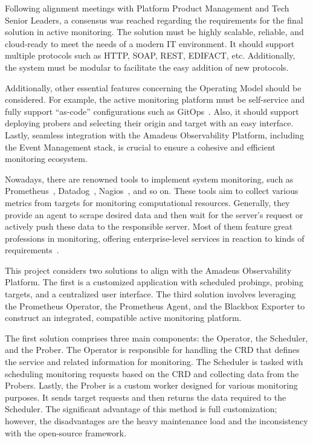 Following alignment meetings with Platform Product Management and Tech Senior Leaders, a consensus was reached regarding the requirements for the final solution in active monitoring. The solution must be highly scalable, reliable, and cloud-ready to meet the needs of a modern \ac{IT} environment. It should support multiple protocols such as \ac{HTTP}, \ac{SOAP}, \ac{REST}, \ac{EDIFACT}, etc. Additionally, the system must be modular to facilitate the easy addition of new protocols.

Additionally, other essential features concerning the Operating Model should be considered. For example, the active monitoring platform must be self-service and fully support “as-code” configurations such as GitOps~\parencite{beetzGitOpsEvolutionDevOps2022}. Also, it should support deploying probers and selecting their origin and target with an easy interface. Lastly, seamless integration with the Amadeus Observability Platform, including the Event Management stack, is crucial to ensure a cohesive and efficient monitoring ecosystem.

Nowadays, there are renowned tools to implement system monitoring, such as Prometheus~\parencite{PrometheusMonitoringSystem}, Datadog~\parencite{CloudMonitoringService}, Nagios~\parencite{NagiosOpenSource}, and so on. These tools aim to collect various metrics from targets for monitoring computational resources. Generally, they provide an agent to scrape desired data and then wait for the server's request or actively push these data to the responsible server. Most of them feature great professions in monitoring, offering enterprise-level services in reaction to kinds of requirements~\parencite{nevesDetailedBlackboxMonitoring2021}. 

This project considers two solutions to align with the Amadeus Observability Platform. The first is a customized application with scheduled probings, probing targets, and a centralized user interface. The third solution involves leveraging the Prometheus Operator, the Prometheus Agent, and the Blackbox Exporter to construct an integrated, compatible active monitoring platform. 

The first solution comprises three main components: the Operator, the Scheduler, and the Prober. The Operator is responsible for handling the \ac{CRD} that defines the service and related information for monitoring. The Scheduler is tasked with scheduling monitoring requests based on the \ac{CRD} and collecting data from the Probers. Lastly, the Prober is a custom worker designed for various monitoring purposes. It sends target requests and then returns the data required to the Scheduler. The significant advantage of this method is full customization; however, the disadvantages are the heavy maintenance load and the inconsistency with the open-source framework. 

